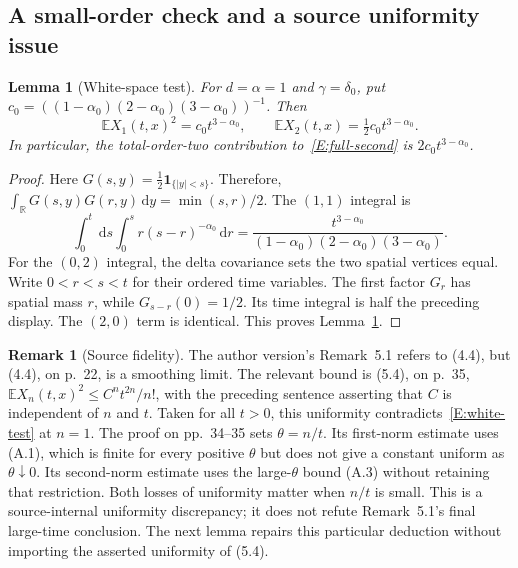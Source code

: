 \documentclass[12pt]{article}
\numberwithin{equation}{section}
\newtheorem{lemma}[theorem]{Lemma}
\theoremstyle{definition}
\newtheorem{remark}[theorem]{Remark}
\newcommand{\R}{\mathbb{R}}
\newcommand{\E}{\mathbb{E}}
\newcommand{\ud}{\,\mathrm{d}}
\begin{document}
\subsection{A small-order check and a source uniformity issue}

\begin{lemma}[White-space test]\label{L:white-test}
  For $d=\alpha=1$ and $\gamma=\delta_0$, put
  $c_0=((1-\alpha_0)(2-\alpha_0)(3-\alpha_0))^{-1}$. Then
  \begin{equation}\label{E:white-test}
    \E X_1(t,x)^2=c_0t^{3-\alpha_0},\qquad
    \E X_2(t,x)=\tfrac12c_0t^{3-\alpha_0}.
  \end{equation}
  In particular, the total-order-two contribution to~\eqref{E:full-second}
  is $2c_0t^{3-\alpha_0}$.
\end{lemma}

\begin{proof}
  Here $G(s,y)=\frac12\mathbf1_{\{|y|<s\}}$. Therefore,
  $\int_\R G(s,y)G(r,y)\ud y=\min(s,r)/2$. The $(1,1)$ integral is
  \[
    \int_0^t\ud s\int_0^s r(s-r)^{-\alpha_0}\ud r
    =\frac{t^{3-\alpha_0}}
    {(1-\alpha_0)(2-\alpha_0)(3-\alpha_0)}.
  \]
  For the $(0,2)$ integral, the delta covariance sets the two spatial
  vertices equal. Write $0<r<s<t$ for their ordered time variables.
  The first factor $G_r$ has spatial mass $r$, while
  $G_{s-r}(0)=1/2$. Its time integral is half the
  preceding display. The $(2,0)$ term is identical. This proves
  Lemma~\ref{L:white-test}.
\end{proof}

\begin{remark}[Source fidelity]\label{R:source-uniformity}
  The author version's Remark~5.1 refers to (4.4), but (4.4), on p.~22,
  is a smoothing limit. The relevant bound is (5.4), on p.~35,
  $\E X_n(t,x)^2\le C^nt^{2n}/n!$, with the preceding sentence asserting
  that $C$ is independent of $n$ and $t$. Taken for all $t>0$, this
  uniformity contradicts~\eqref{E:white-test} at $n=1$.
  The proof on pp.~34--35 sets $\theta=n/t$. Its first-norm estimate
  uses (A.1), which is finite for every positive $\theta$ but does not
  give a constant uniform as $\theta\downarrow0$. Its second-norm
  estimate uses the large-$\theta$ bound (A.3) without retaining that
  restriction. Both losses of uniformity matter when $n/t$ is small.
  This is a source-internal uniformity discrepancy; it does not refute
  Remark~5.1's final large-time conclusion. The next lemma repairs this
  particular deduction without importing the asserted uniformity of (5.4).
\end{remark}
\end{document}
